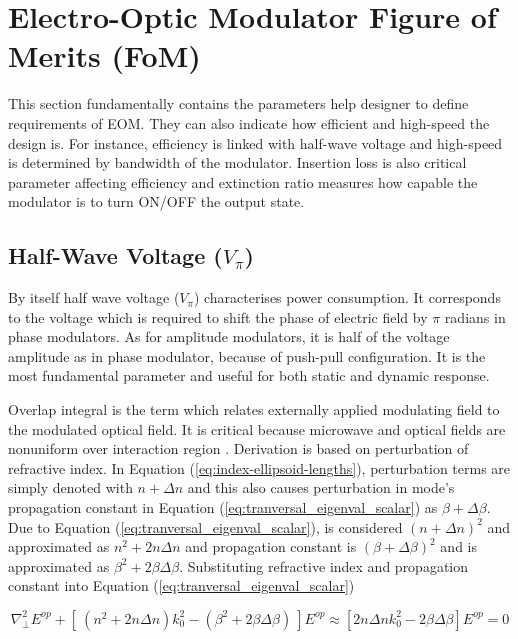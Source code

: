 \documentclass[thesis]{deutez}
\begin{document}
    

    \section{Electro-Optic Modulator Figure of Merits (FoM)}
    \label{sec:el-op-fom}
    This section fundamentally contains the parameters help designer to define requirements of EOM. They can also indicate how efficient and high-speed the design is. For instance, efficiency is linked with half-wave voltage and high-speed is determined by bandwidth of the modulator. Insertion loss is also critical parameter affecting efficiency and extinction ratio measures how capable the modulator is to turn ON/OFF the output state.
    
    \subsection{Half-Wave Voltage ($V_\pi$)}
    By itself half wave voltage ($V_\pi$) characterises power consumption.  It corresponds to the voltage which is required to shift the phase of electric field by $\pi$ radians in phase modulators. As for amplitude modulators, it is half of the voltage amplitude as in phase modulator, because of push-pull configuration. It is the most fundamental parameter and useful for both static and dynamic response. 
    
    Overlap integral is the term which relates externally applied modulating field to the modulated optical field. It is critical because microwave and optical fields are nonuniform over interaction region \cite{16}. Derivation is based on perturbation of refractive index. In Equation (\ref{eq:index-ellipsoid-lengths}), perturbation terms are simply denoted with $n+\Delta n$ and this also causes perturbation in mode's propagation constant in Equation (\ref{eq:tranversal_eigenval_scalar}) as $\beta + \Delta \beta$. Due to Equation (\ref{eq:tranversal_eigenval_scalar}), is considered $(n+\Delta n)^2$ and approximated as $n^2+2n\Delta n$ and propagation constant is $(\beta+\Delta\beta)^2$ and is approximated as $\beta^2+2\beta\Delta\beta$. Substituting refractive index and  propagation constant into Equation (\ref{eq:tranversal_eigenval_scalar}) 


    \begin{equation}
        \nabla^2_{\perp} E^{op}+\left[ \:(n^2+2n\Delta n)k_0^2 - (\beta^2+2\beta\Delta\beta)  \:
    \right] E^{op} \approx \left[ 2n\Delta nk_0^2 - 2\beta\Delta\beta \right] E^{op} = 0
    \label{eq:perturbed-eigenval-eq}
    \end{equation}
\end{document}
